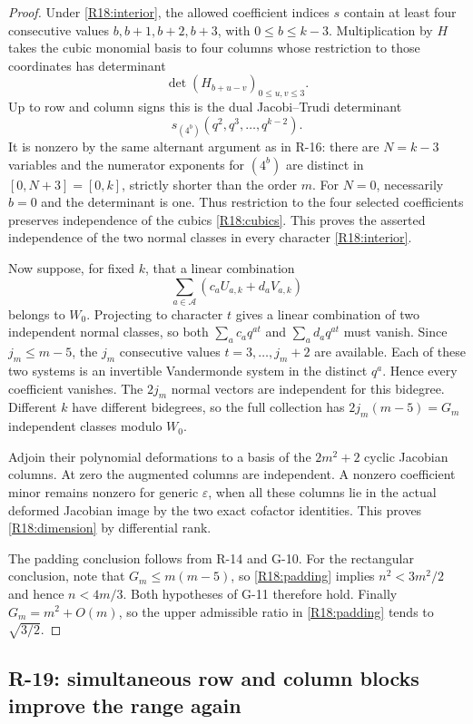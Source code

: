 \documentclass[11pt,a4paper]{article}
\theoremstyle{definition}\newtheorem{definition}{Definition}
\begin{document}
\begin{proof}
Under \eqref{R18:interior}, the allowed coefficient
indices $s$ contain at least four consecutive values
$b,b+1,b+2,b+3$, with $0\leq b\leq k-3$.
Multiplication by $H$ takes the cubic monomial basis
to four columns whose restriction to those coordinates
has determinant
\[
 \det(H_{b+u-v})_{0\leq u,v\leq3}.
\]
Up to row and column signs this is the dual
Jacobi--Trudi determinant
\[
 s_{(4^b)}(q^2,q^3,\ldots,q^{k-2}).
\]
It is nonzero by the same alternant argument as in
R-16: there are $N=k-3$ variables and the numerator
exponents for $(4^b)$ are distinct in
$[0,N+3]=[0,k]$, strictly shorter than the order $m$.
For $N=0$, necessarily $b=0$ and the determinant is one.
Thus restriction to the four selected coefficients
preserves independence of the cubics
\eqref{R18:cubics}. This proves the asserted independence
of the two normal classes in every character
\eqref{R18:interior}.

Now suppose, for fixed $k$, that a linear combination
\[
 \sum_{a\in\mathcal A}
        (c_aU_{a,k}+d_aV_{a,k})
\]
belongs to $W_0$. Projecting to character $t$ gives a
linear combination of two independent normal classes,
so both $\sum_a c_aq^{at}$ and
$\sum_a d_aq^{at}$ must vanish.
Since $j_m\leq m-5$, the $j_m$ consecutive values
$t=3,\ldots,j_m+2$ are available. Each of these two
systems is an invertible Vandermonde system in the
distinct $q^a$. Hence every coefficient vanishes.
The $2j_m$ normal vectors are independent for this
bidegree. Different $k$ have different bidegrees, so
the full collection has $2j_m(m-5)=G_m$ independent
classes modulo $W_0$.

Adjoin their polynomial deformations to a basis of
the $2m^2+2$ cyclic Jacobian columns. At zero the
augmented columns are independent. A nonzero coefficient
minor remains nonzero for generic $\varepsilon$, when
all these columns lie in the actual deformed Jacobian
image by the two exact cofactor identities. This proves
\eqref{R18:dimension} by differential rank.

The padding conclusion follows from R-14 and G-10.
For the rectangular conclusion, note that
$G_m\leq m(m-5)$, so \eqref{R18:padding} implies
$n^2<3m^2/2$ and hence $n<4m/3$.
Both hypotheses of G-11 therefore hold.
Finally $G_m=m^2+O(m)$, so the upper admissible ratio
in \eqref{R18:padding} tends to $\sqrt{3/2}$.
\end{proof}


\subsection{R-19: simultaneous row and column blocks improve the range again}
\end{document}
